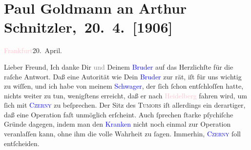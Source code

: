 

\renewcommand{\erwaehntePersonen}{Personen: Vincenz Czerny, Fedor Mamroth, Josef Rosengart, Julius Schnitzler}
\renewcommand{\erwaehnteOrte}{Orte: Frankfurt am Main, Heidelberg, Wien}
\renewcommand{\erwaehnteWerke}{}
\section[ Paul Goldmann an Arthur Schnitzler, 20. 4. {[}1906{]}]{Paul Goldmann an Arthur Schnitzler, 20. 4. {[}1906{]}}
\nopagebreak{}
\rehead{ }\normalsize\beginnumbering{}
\toendnotes[C]{\smallbreak\pagebreak[2]}
\toendnotes[C]{\smallbreak}
\pstart
           \centering{}{\pb}\textcolor{pink}{Frankfurt}{}\ledrightnote{\textcolor{pink}{Frankfurt am Main}}{ }20. April.\pend
           
\pstart
           Lieber Freund, Ich danke Dir \textcolor{gray}{und}
               Deinem \textcolor{blue}{Bruder}{}\ledrightnote{{$\rightarrow$}\textcolor{blue}{Julius Schnitzler}} auf das
               Herzlichſte für die raſche Antwort. Daß eine Autorität \strikeout{\textcolor{gray}{×}} wie Dein \textcolor{blue}{Bruder}{}\ledrightnote{{$\rightarrow$}\textcolor{blue}{Julius Schnitzler}} zur
                  \label{K_L03244-11v}\label{K_L03244-11h}{ } rät, iſt für uns wichtig zu
               wiſſen, und ich habe von meinem \textcolor{blue}{Schwager}{}\ledrightnote{{$\rightarrow$}\textcolor{blue}{Josef Rosengart}}, der ſich ſchon entſchloſſen hatte, nichts weiter zu tun,
               wenigſtens erreicht, daß er nach \textcolor{pink}{Heidelberg}{}\ledrightnote{\textcolor{pink}{Heidelberg}}
               fahren wird, um ſich mit \textsc{\textcolor{blue}{Czerny}{}\ledrightnote{\textcolor{blue}{Vincenz Czerny}}} zu beſprechen. Der Sitz des \textsc{Tumors} iſt allerdings {\pb}ein derartiger, daß eine Operation faſt unmöglich
               erſcheint. Auch ſprechen ſtarke pſychiſche Gründe dagegen, indem man den \textcolor{blue}{Kranken}{}\ledrightnote{{$\rightarrow$}\textcolor{blue}{Fedor Mamroth}} nicht noch einmal zur
               Operation veranlaſſen kann, ohne ihm die volle Wahrheit zu ſagen. Immerhin, \textsc{\textcolor{blue}{Czerny}{}\ledrightnote{\textcolor{blue}{Vincenz Czerny}}} ſoll entſcheiden.\pend
           
